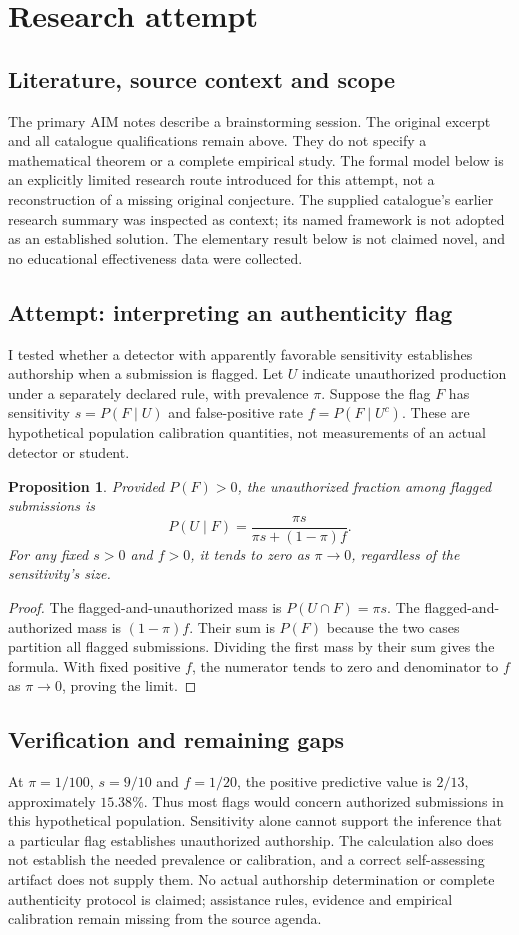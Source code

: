 \documentclass[11pt]{article}
\newtheorem{proposition}{Proposition}
\begin{document}
\section{Research attempt}
\subsection{Literature, source context and scope}
The primary AIM notes describe a brainstorming session. The original excerpt and all catalogue qualifications remain above. They do not specify a mathematical theorem or a complete empirical study. The formal model below is an explicitly limited research route introduced for this attempt, not a reconstruction of a missing original conjecture. The supplied catalogue's earlier research summary was inspected as context; its named framework is not adopted as an established solution. The elementary result below is not claimed novel, and no educational effectiveness data were collected.

\subsection{Attempt: interpreting an authenticity flag}
I tested whether a detector with apparently favorable sensitivity establishes authorship when a submission is flagged. Let $U$ indicate unauthorized production under a separately declared rule, with prevalence $\pi$. Suppose the flag $F$ has sensitivity $s=P(F\mid U)$ and false-positive rate $f=P(F\mid U^c)$. These are hypothetical population calibration quantities, not measurements of an actual detector or student.
\begin{proposition}
Provided $P(F)>0$, the unauthorized fraction among flagged submissions is
\[
P(U\mid F)=\frac{\pi s}{\pi s+(1-\pi)f}.
\]
For any fixed $s>0$ and $f>0$, it tends to zero as $\pi\to0$, regardless of the sensitivity's size.
\end{proposition}
\begin{proof}
The flagged-and-unauthorized mass is $P(U\cap F)=\pi s$. The flagged-and-authorized mass is $(1-\pi)f$. Their sum is $P(F)$ because the two cases partition all flagged submissions. Dividing the first mass by their sum gives the formula. With fixed positive $f$, the numerator tends to zero and denominator to $f$ as $\pi\to0$, proving the limit.
\end{proof}
\subsection{Verification and remaining gaps}
At $\pi=1/100$, $s=9/10$ and $f=1/20$, the positive predictive value is $2/13$, approximately $15.38\%$. Thus most flags would concern authorized submissions in this hypothetical population. Sensitivity alone cannot support the inference that a particular flag establishes unauthorized authorship. The calculation also does not establish the needed prevalence or calibration, and a correct self-assessing artifact does not supply them. No actual authorship determination or complete authenticity protocol is claimed; assistance rules, evidence and empirical calibration remain missing from the source agenda.
\end{document}
